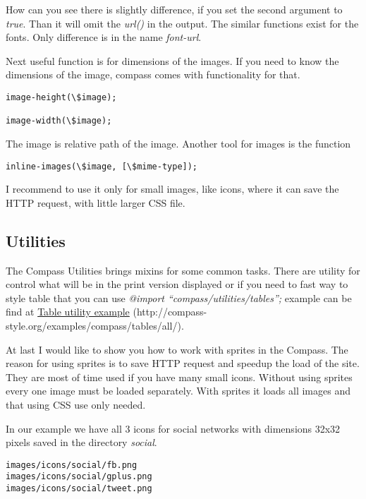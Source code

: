 \documentclass[a4paper,12pt,oneside,pdftex]{sphinxmanual}
\begin{document}
How can you see there is slightly difference, if you set the second argument to \emph{true}. Than it will omit the \emph{url()} in the output. The similar functions exist for the fonts. Only difference is in the name \emph{font-url}.

Next useful function is for dimensions of the images. If you need to know the dimensions of the image, compass comes with functionality for that.

\begin{Verbatim}[commandchars=\\\{\}]
image-height(\$image);

image-width(\$image);
\end{Verbatim}

The image is relative path of the image. Another tool for images is the function

\begin{Verbatim}[commandchars=\\\{\}]
inline-images(\$image, [\$mime-type]);
\end{Verbatim}

I recommend to use it only for small images, like icons, where it can save the HTTP request, with little larger CSS file.


\subsection{Utilities}
\label{src/compass:utilities}
The Compass Utilities brings mixins for some common tasks. There are utility for control what will be in the print version displayed or if you need to fast way to style table that you can use \emph{@import ``compass/utilities/tables'';} example can be find at \href{http://compass-style.org/examples/compass/tables/all/}{Table utility example} (http://compass-style.org/examples/compass/tables/all/).

At last I would like to show you how to work with sprites in the Compass. The reason for using sprites is to save HTTP request and speedup the load of the site. They are most of time used if you have many small icons. Without using sprites every one image must be loaded separately. With sprites it loads all images and that using CSS use only needed.

In our example we have all 3 icons for social networks with dimensions 32x32 pixels saved in the directory \emph{social}.

\begin{Verbatim}[commandchars=\\\{\}]
images/icons/social/fb.png
images/icons/social/gplus.png
images/icons/social/tweet.png
\end{Verbatim}
\end{document}

